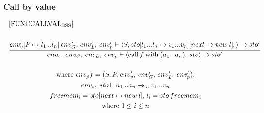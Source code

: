 \subsubsection*{Call by value}
\begin{equation} \label{app:FUNCCALLVALRAP}
\begin{split}
\begin{minipage}{\linewidth}
$[\text{FUNCCALLVAL}_\text{BSS}]$
\end{minipage}
\\\\
\begin{minipage}{\linewidth}
\centering
$\cfrac{env'_v[P \mapsto l_1...l_n] \: env'_G, \: env'_L, \: env'_p \vdash \langle S, sto[l_1...l_n \mapsto v_1...v_n][next \mapsto new \: l], \rangle \xrightarrow{} sto'}{env_v, \: env_G, \: env_L, \: env_p \vdash \langle \text{call} \: f \: \text{with} \: (a_1...a_n), \: sto \rangle \xrightarrow{} sto'}$
\end{minipage}
\\\\
\begin{minipage}{\linewidth}
\centering
where $env_p f = (S, P, env'_v, \: env_G', \: env'_L, \: env'_p),$
\end{minipage}
\\
\begin{minipage}{\linewidth}
\centering
$env_v, \: sto \vdash a_1...a_n \xrightarrow{}\textsubscript{a} \: v_1...v_n$
\end{minipage}
\\
\begin{minipage}{\linewidth}
\centering
$freemem_i = sto[next \mapsto new \: l]$, $l_i = sto \: freemem_i$
\end{minipage}
\\
\begin{minipage}{\linewidth}
\centering
where $1 \leq i \leq n $
\end{minipage}
\end{split}
\end{equation}
\noindent

